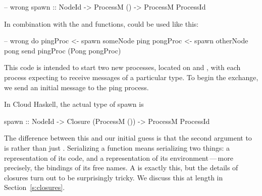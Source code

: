 \documentclass{sigplanconf}
\begin{document}
\begin{code}
-- wrong
spawn :: NodeId -> ProcessM () -> ProcessM ProcessId
\end{code}

In combination with the  and  functions,  could be used like this:

\needspace{4ex}
\begin{code}
-- wrong
do pingProc <- spawn someNode ping
   pongProc <- spawn otherNode pong
   send pingProc (Pong pongProc)
\end{code}

This code is intended to start two new processes, located on  and , with each process expecting to receive messages of a particular type. To begin the exchange, we send an initial  message to the ping process.

In Cloud Haskell, the actual type of spawn is
\begin{code}
spawn :: NodeId -> Closure (ProcessM ()) 
      		-> ProcessM ProcessId
\end{code}
\noindent
The difference between this and our initial guess is that the second argument to  is  rather than just .
Serializing a function means serializing two things: a representation of its code, and a representation of its environment\,---\,more precisely, the bindings of its free names.
A  is exactly this, but the details of closures turn out to be surprisingly tricky.
We discuss this at length in Section~\ref{s:closures}.
\label{s:closureForeshadow}
\end{document}

